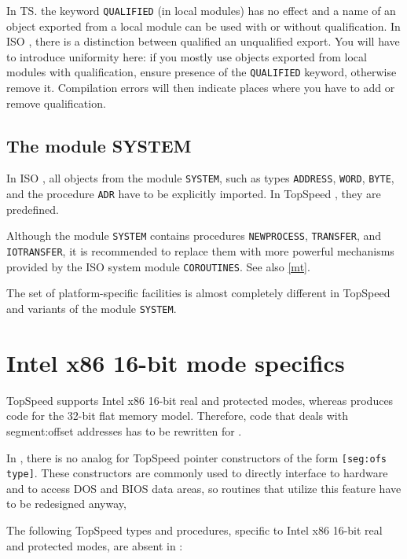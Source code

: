     In TS. the keyword \verb'QUALIFIED' (in local modules) has no effect and
    a name of an object exported from a local module can be used with or
    without qualification. In ISO \mt{}, there is a distinction between
    qualified an unqualified export. You will have to introduce uniformity
    here: if you mostly use objects exported from local modules with 
    qualification, ensure presence of the \verb'QUALIFIED' keyword, otherwise
    remove it. Compilation errors will then indicate places where you have to
    add or remove qualification.

\subsection{The module SYSTEM}

    In ISO \mt{}, all objects from the module \verb'SYSTEM', such as types
    \verb'ADDRESS', \verb'WORD', \verb'BYTE', and the procedure \verb'ADR'
    have to be explicitly imported. In TopSpeed \mt{}, they are predefined.

    Although the \xds{} module \verb'SYSTEM' contains procedures 
    \verb'NEWPROCESS', \verb'TRANSFER', and \verb'IOTRANSFER', 
    it is recommended to replace them with more powerful mechanisms provided 
    by the ISO system module \verb'COROUTINES'. See also \ref{mt}.

    The set of platform-specific facilities is almost completely different
    in TopSpeed and \xds{} variants of the module \verb'SYSTEM'.

\section{Intel x86 16-bit mode specifics}

    TopSpeed \mt{} supports Intel x86 16-bit real and protected modes,
    whereas \XDS{} produces code for the 32-bit flat memory model. 
    Therefore, code that deals with segment:offset addresses has to be
    rewritten for \XDS{}.

    In \XDS{}, there is no analog for TopSpeed pointer constructors of 
    the form \verb'[seg:ofs type]'. These constructors are commonly used 
    to directly interface to hardware and to access DOS and BIOS data areas,
    so routines that utilize this feature have to be redesigned anyway,

    The following TopSpeed \mt{} types and procedures, specific to
    Intel x86 16-bit real and protected modes, are absent in \xds{}:

